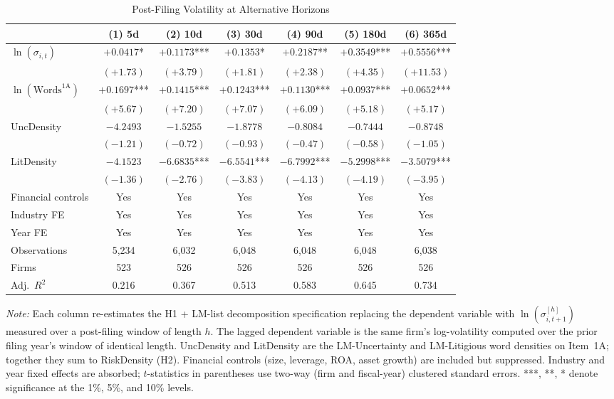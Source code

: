\begin{table}[htbp]
\centering
\caption{Post-Filing Volatility at Alternative Horizons}
\label{tab:horizons}
\footnotesize
\setlength{\tabcolsep}{5pt}
\begin{tabular*}{\textwidth}{@{\extracolsep{\fill}}lcccccc@{}}
\toprule
 & (1) 5d & (2) 10d & (3) 30d & (4) 90d & (5) 180d & (6) 365d \\
\midrule
$\ln(\sigma_{i,t})$ & $+0.0417$* & $+0.1173$*** & $+0.1353$* & $+0.2187$** & $+0.3549$*** & $+0.5556$*** \\
 & $(+1.73)$ & $(+3.79)$ & $(+1.81)$ & $(+2.38)$ & $(+4.35)$ & $(+11.53)$ \\[4pt]
$\ln(\text{Words}^{\text{1A}})$ & $+0.1697$*** & $+0.1415$*** & $+0.1243$*** & $+0.1130$*** & $+0.0937$*** & $+0.0652$*** \\
 & $(+5.67)$ & $(+7.20)$ & $(+7.07)$ & $(+6.09)$ & $(+5.18)$ & $(+5.17)$ \\[4pt]
UncDensity & $-4.2493$ & $-1.5255$ & $-1.8778$ & $-0.8084$ & $-0.7444$ & $-0.8748$ \\
 & $(-1.21)$ & $(-0.72)$ & $(-0.93)$ & $(-0.47)$ & $(-0.58)$ & $(-1.05)$ \\[4pt]
LitDensity & $-4.1523$ & $-6.6835$*** & $-6.5541$*** & $-6.7992$*** & $-5.2998$*** & $-3.5079$*** \\
 & $(-1.36)$ & $(-2.76)$ & $(-3.83)$ & $(-4.13)$ & $(-4.19)$ & $(-3.95)$ \\[4pt]
\midrule
Financial controls & Yes & Yes & Yes & Yes & Yes & Yes \\
Industry FE & Yes & Yes & Yes & Yes & Yes & Yes \\
Year FE & Yes & Yes & Yes & Yes & Yes & Yes \\
Observations & 5,234 & 6,032 & 6,048 & 6,048 & 6,048 & 6,038 \\
Firms & 523 & 526 & 526 & 526 & 526 & 526 \\
Adj.\ $R^2$ & 0.216 & 0.367 & 0.513 & 0.583 & 0.645 & 0.734 \\
\bottomrule
\end{tabular*}
\par\smallskip
\begin{flushleft}\footnotesize 
\textit{Note:} Each column re-estimates the H1 + LM-list decomposition specification replacing the dependent variable with $\ln(\sigma_{i,t+1}^{[h]})$ measured over a post-filing window of length $h$. The lagged dependent variable is the same firm's log-volatility computed over the prior filing year's window of identical length. UncDensity and LitDensity are the LM-Uncertainty and LM-Litigious word densities on Item~1A; together they sum to RiskDensity (H2). Financial controls (size, leverage, ROA, asset growth) are included but suppressed. Industry and year fixed effects are absorbed; $t$-statistics in parentheses use two-way (firm and fiscal-year) clustered standard errors. ***, **, * denote significance at the 1\%, 5\%, and 10\% levels.
\end{flushleft}
\end{table}